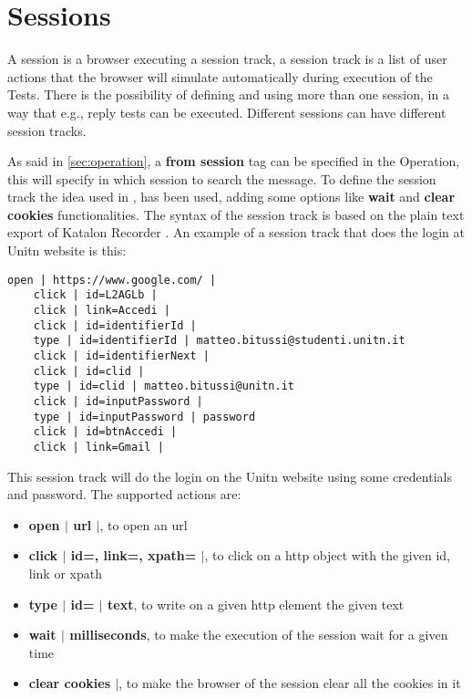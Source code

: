 \section{Sessions}
A session is a browser executing a \gls{session track}, a \gls{session track} is a list of user actions that the browser will simulate automatically during execution of the Tests. There is the possibility of defining and using more than one session, in a way that e.g., reply tests can be executed. Different sessions can have different session tracks.

As said in \ref{sec:operation}, a \textbf{from session} tag can be specified in the Operation, this will specify in which session to search the message. To define the \gls{session track} the idea used in \cite{claudio_grisenti,stefano_facchini}, has been used, adding some options like \textbf{wait} and \textbf{clear cookies} functionalities.
The syntax of the \gls{session track} is based on the plain text export of Katalon Recorder \cite{katalon_recorder_syntax}. 
An example of a \gls{session track} that does the login at Unitn website is this:

\begin{lstlisting}[caption=Session track Unitn login]
    open | https://www.google.com/ |
    click | id=L2AGLb |
    click | link=Accedi |
    click | id=identifierId |
    type | id=identifierId | matteo.bitussi@studenti.unitn.it
    click | id=identifierNext |
    click | id=clid |
    type | id=clid | matteo.bitussi@unitn.it
    click | id=inputPassword |
    type | id=inputPassword | password
    click | id=btnAccedi |
    click | link=Gmail |
\end{lstlisting}

This \gls{session track} will do the login on the Unitn website using some credentials and password. The supported actions are:
\begin{itemize}
    \item \textbf{open $|$ url $|$}, to open an url
    \item \textbf{click $|$ id=, link=, xpath= $|$}, to click on a http object with the given id, link or xpath
    \item \textbf{type $|$ id= $|$ text}, to write on a given http element the given text
    \item \textbf{wait $|$ milliseconds}, to make the execution of the session wait for a given time 
    \item \textbf{clear cookies $|$}, to make the browser of the session clear all the cookies in it
\end{itemize}


 
